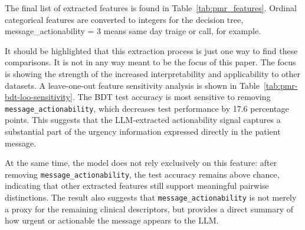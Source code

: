 \documentclass{article}
\begin{document}
The final list of extracted features is found in Table~\ref{tab:pmr_features}. Ordinal categorical features are converted to integers for the decision tree, message\_actionability = 3 means same day traige or call, for example.

It should be highlighted that this extraction process is just one way to find these comparisons. It is not in any way meant to be the focus of this paper. The focus is showing the strength of the increased interpretability and applicability to other datasets. A leave-one-out feature sensitivity analysis is shown in Table~\ref{tab:pmr-bdt-loo-sensitivity}. The BDT test accuracy is most sensitive to removing \texttt{message\_actionability}, which decreases test performance by 17.6 percentage points. This suggests that the LLM-extracted actionability signal captures a substantial part of the urgency information expressed directly in the patient message.

At the same time, the model does not rely exclusively on this feature: after removing \texttt{message\_actionability}, the test accuracy remains above chance, indicating that other extracted features still support meaningful pairwise distinctions. The result also suggests that \texttt{message\_actionability} is not merely a proxy for the remaining clinical descriptors, but provides a direct summary of how urgent or actionable the message appears to the LLM.
\end{document}
